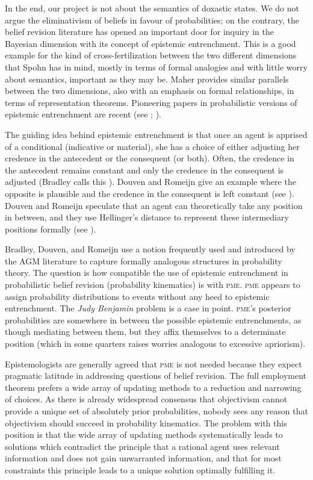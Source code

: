 \documentclass[phd,12pt,oneside]{ubcthesis}
\begin{document}
In the end, our project is not about the semantics of doxastic states.
We do not argue the eliminativism of beliefs in favour of
probabilities; on the contrary, the belief revision literature has
opened an important door for inquiry in the Bayesian dimension with
its concept of epistemic entrenchment. This is a good example for the
kind of cross-fertilization between the two different dimensions that
Spohn has in mind, mostly in terms of formal analogies and with little
worry about semantics, important as they may be. Maher provides
similar parallels between the two dimensions, also with an emphasis on
formal relationships, in terms of representation theorems. Pioneering
papers in probabilistic versions of epistemic entrenchment are recent
(see ; ).

The guiding idea behind epistemic entrenchment is that once an agent
is apprised of a conditional (indicative or material), she has a
choice of either adjusting her credence in the antecedent or the
consequent (or both). Often, the credence in the antecedent remains
constant and only the credence in the consequent is adjusted (Bradley
calls this ). Douven and Romeijn give an
example where the opposite is plausible and the credence in the
consequent is left constant (see ).
Douven and Romeijn speculate that an agent can theoretically take any
position in between, and they use Hellinger's distance to represent
these intermediary positions formally (see
).

Bradley, Douven, and Romeijn use a notion frequently used and
introduced by the AGM literature to capture formally analogous
structures in probability theory. The question is how compatible the
use of epistemic entrenchment in probabilistic belief revision
(probability kinematics) is with \textsc{pme}. \textsc{pme} appears to
assign probability distributions to events without any heed to
epistemic entrenchment. The \emph{Judy Benjamin} problem is a case in
point. \textsc{pme}'s posterior probabilities are somewhere in between
the possible epistemic entrenchments, as though mediating between
them, but they affix themselves to a determinate position (which in
some quarters raises worries analogous to excessive apriorism).

Epistemologists are generally agreed that \textsc{pme} is not needed
because they expect pragmatic latitude in addressing questions of
belief revision. The full employment theorem prefers a wide array of
updating methods to a reduction and narrowing of choices. As there is
already widespread consensus that objectivism cannot provide a unique
set of absolutely prior probabilities, nobody sees any reason that
objectivism should succeed in probability kinematics. The problem with
this position is that the wide array of updating methods
systematically leads to solutions which contradict the principle that
a rational agent uses relevant information and does not gain
unwarranted information, and that for most constraints this principle
leads to a unique solution optimally fulfilling it.
\end{document}
